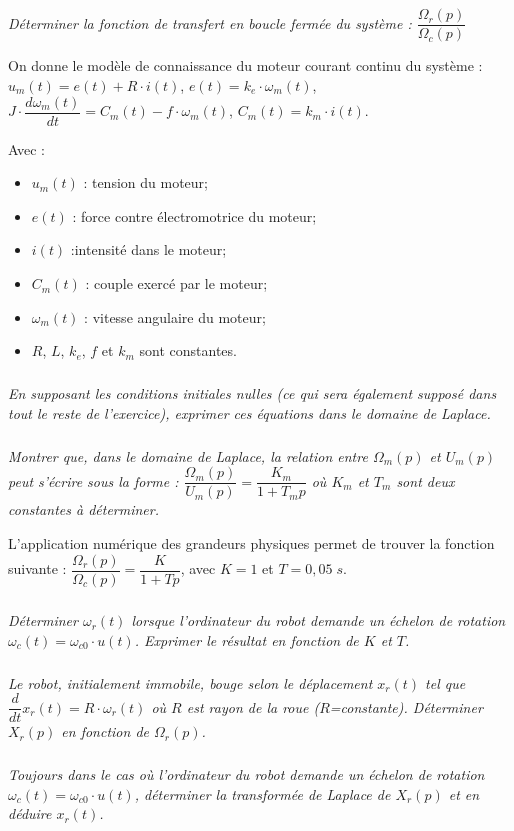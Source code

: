 \documentclass[10pt,fleqn]{article} %
\begin{document}
\begin{multicols}{2}
\subparagraph{}
\textit{ Déterminer la fonction de transfert en boucle fermée du système : $\dfrac{\Omega_r(p)}{\Omega_c(p)}$}


On donne le modèle de connaissance du moteur courant continu du système :
$u_m(t) = e(t) + R\cdot i(t)$, $e(t) = k_e\cdot \omega_m(t)$, $J\cdot \dfrac{d\omega_m(t)}{dt} = C_m (t) -f\cdot \omega_m(t)$, $C_m (t) = k_m \cdot i(t)$.


Avec : 
\begin{itemize}
\item $u_m (t)$ : tension du moteur; 
\item $e(t)$ : force contre électromotrice du moteur; 
\item $i(t)$ :intensité dans le moteur;
\item $C_m (t)$ : couple exercé par le moteur;
\item $\omega_m(t)$ : vitesse angulaire du moteur;
\item $R$, $L$, $k_e$, $f$ et $k_m$ sont constantes.
\end{itemize}

\subparagraph{}
\textit{En supposant les conditions initiales nulles (ce qui sera également supposé dans tout le reste de l'exercice), exprimer ces équations dans le domaine de Laplace. }


\subparagraph{}
\textit{Montrer que, dans le domaine de Laplace, la relation entre $\Omega_m (p)$ et $U_m (p)$ peut s'écrire sous la forme : $\dfrac{\Omega_m(p)}{U_m(p)} = \dfrac{K_m}{1+T_mp} $ où $K_m$ et $T_m$ sont deux constantes à déterminer.}

L'application numérique des grandeurs physiques permet de trouver la fonction suivante : 
$\dfrac{\Omega_r(p)}{\Omega_c(p)}=\dfrac{K}{1+Tp}$, avec $K=1$ et $T=0,05\;s$.



\subparagraph{}
\textit{Déterminer $\omega_r (t)$ lorsque l’ordinateur du robot demande un échelon de rotation $\omega_c (t) = \omega_{c0} \cdot u(t)$. Exprimer le résultat en fonction de $K$ et $T$.}



\subparagraph{}
\textit{Le robot, initialement immobile, bouge selon le déplacement $x_r (t)$ tel que $\dfrac{d}{dt} x_r (t) = R\cdot \omega_r (t)$ où $R$ est rayon de la roue ($R$=constante). Déterminer $X_r (p)$ en fonction de $\Omega_r (p)$.}

\subparagraph{}
\textit{Toujours dans le cas où l'ordinateur du robot demande un échelon de rotation $\omega_c (t) = \omega_{c0}\cdot u(t)$, déterminer la transformée de Laplace de $X_r (p)$ et en déduire $x_r (t)$.} 


\end{multicols}
\end{document}
